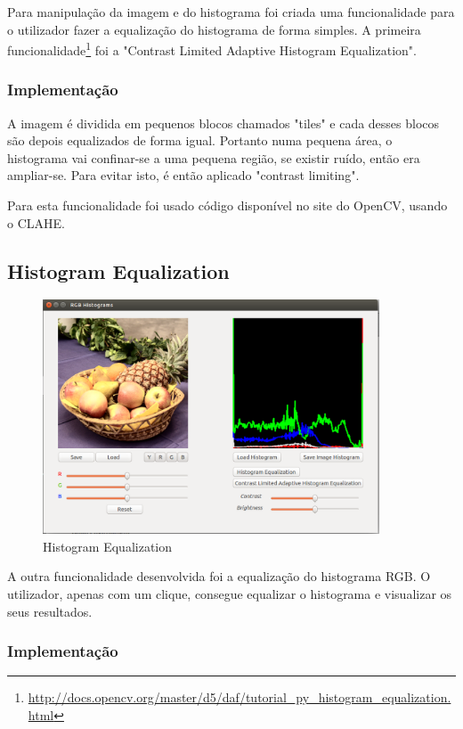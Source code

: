 \documentclass[pdftex,12pt,a4paper]{report}
\begin{document}
Para manipulação da imagem e do histograma foi criada uma funcionalidade para o utilizador fazer a equalização do histograma de forma simples. A primeira funcionalidade\footnote{\label{url5} \url{http://docs.opencv.org/master/d5/daf/tutorial_py_histogram_equalization.html}} foi a "Contrast Limited Adaptive Histogram Equalization". 

\subsubsection{Implementação}

A imagem é dividida em pequenos blocos chamados "tiles" e cada desses blocos são depois equalizados de forma igual. Portanto numa pequena área, o histograma vai confinar-se a uma pequena região, se existir ruído, então era ampliar-se. Para evitar isto, é então aplicado "contrast limiting". 

Para esta funcionalidade foi usado código disponível no site do OpenCV, usando o CLAHE.

\subsection{Histogram Equalization}

\begin{figure}[!htb]
\center
 \includegraphics[width=100mm,scale=1]{imagens/histogram_eq.png}
 \caption{Histogram Equalization}
 \label{fig:brilho}
\end{figure}

A outra funcionalidade desenvolvida foi a equalização do histograma RGB. O utilizador, apenas com um clique, consegue equalizar o histograma e visualizar os seus resultados.

\subsubsection{Implementação}
\end{document}
